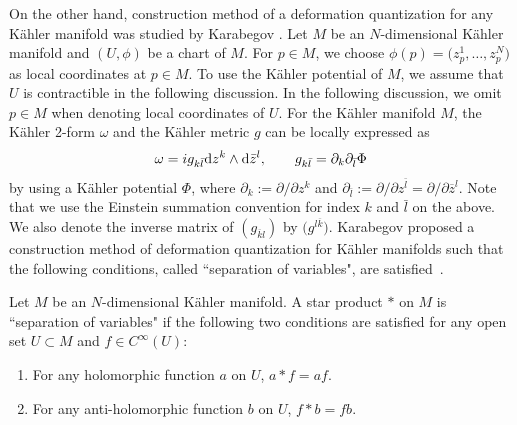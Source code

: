 \documentclass[10pt,a4paper]{amsart}
\numberwithin{equation}{section}
\begin{document}
On the other hand, construction method of a deformation quantization for any K\"ahler manifold was studied by Karabegov \cite{Kara2,Kara1}. Let $M$ be an $N$-dimensional K\"ahler manifold and
$(U,\phi)$ be a chart of $M$. For
$
p
\in
M
$, we choose
$
\phi(p)
=
 \bigl(z^{1}_{p},\dots,z^{N}_{p} \bigr)
$
as local coordinates at
$
p
\in
M
$.
To use the K\"ahler potential of $M$, we assume that $U$ is contractible in the following discussion. In the following discussion, we omit
$
p
\in
M
$
when denoting local coordinates of $U$. For the K\"ahler manifold $M$, the K\"ahler 2-form $\omega$ and the K\"ahler metric $g$ can be locally expressed as
\begin{align*}
 \omega
 =
 i
 g_{k\bar{l}}
 {\rm d}z^{k}
 \wedge
 {\rm d}\bar{z}^{l},
 \qquad
 g_{k\bar{l}}
 =
 \partial_{k}
 \partial_{\bar{l}}
 \Phi
\end{align*}
by using a K\"ahler potential $\Phi$, where
$
\partial_{k}
:=
\partial/
\partial
z^{k}
$
and
$
\partial_{\bar{l}}
:=
\partial/
\partial
z^{\bar{l}}
=
\partial/
\partial
\overline{z}^{l}
$.
Note that we use the Einstein summation convention for index $k$ and $\bar{l}$ on the above.
We also denote the inverse matrix of $ (g_{\overline{k}l} )$ by $ \bigl(g^{l\overline{k}} \bigr)$.
Karabegov proposed a construction method of deformation quantization for K\"ahler manifolds such that the following conditions, called ``separation of variables", are satisfied~\cite{Kara2,Kara1}.
\begin{Definition} \label{sep_of_bar_starprd}
 Let $M$ be an $N$-dimensional K\"ahler manifold. A star product $\ast$ on $M$ is ``separation of variables" if the following two conditions are satisfied for any open set $
 U
 \subset
 M
 $
 and
 $
 f
 \in
 C^{\infty}
 (
 U
 )
 $:
 \begin{enumerate}\itemsep=0pt
 \item[(1)]
 For any holomorphic function
 $ a $
 on $U$,
 $ a
 \ast
 f
 =
 af $.
 \item[(2)]
 For any anti-holomorphic function
 $ b $
 on $U$,
 $
 f
 \ast
 b
 =
 fb
 $.
 \end{enumerate}
\end{Definition}
\end{document}
